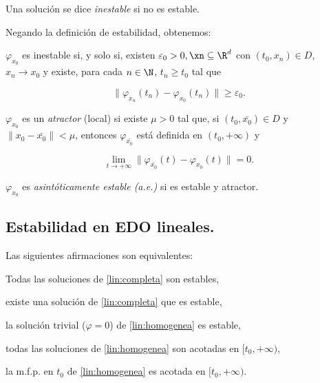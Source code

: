 \begin{ndef}
  Una solución se dice \emph{inestable} si no es estable.
\end{ndef}


Negando la definición de estabilidad, obtenemos:

\begin{nprop}
  $\varphi_{x_0}$ es inestable si, y solo si, existen $\varepsilon_0 > 0, \xn \subseteq\R^d$ con
  $(t_0,x_n)\in D$, $x_n \to x_0$ y existe, para cada $n\in\N$, $t_n \ge t_0$ tal que

  \[
    \| \varphi_{x_n}(t_n) - \varphi_{x_0}(t_n) \| \ge \varepsilon_0
  .\]
\end{nprop}

\begin{ndef}[Atractor]
  $\varphi_{x_0}$ es un \emph{atractor} (local) si existe $\mu > 0$ tal que, si $(t_0, \bar{x_0})\in D$
  y $\| x_0 - \bar{x_0} \| < \mu$, entonces $\varphi_{\bar{x_0}}$ está definida en $(t_0, +\infty)$ y

  \[
     \lim_{t\to+\infty} \| \varphi_{\bar{x_0}}(t) - \varphi_{x_0}(t) \| = 0.
  \]
\end{ndef}

\begin{ndef}
 $\varphi_{x_0}$ es \emph{asintóticamente estable (a.e.)} si es estable y atractor.
\end{ndef}



\subsection{Estabilidad en EDO lineales.}

\begin{nprop}
  Las siguientes afirmaciones son equivalentes:

  \begin{nlist}
  \item Todas las soluciones de \ref{lin:completa} son estables, 
  \item existe una solución de \ref{lin:completa} que es estable,
  \item la solución trivial ($\varphi = 0$) de \ref{lin:homogenea} es estable,
  \item todas las soluciones de \ref{lin:homogenea} son acotadas en $[t_0, +\infty)$,
  \item la m.f.p. en $t_0$ de \ref{lin:homogenea} es acotada en $[t_0, +\infty)$.
  \end{nlist}
\end{nprop}

